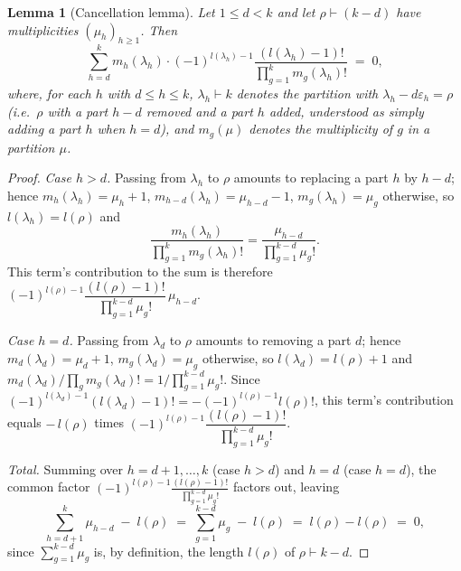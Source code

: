 \documentclass[11pt]{article}
\newtheorem{lemma}[theorem]{Lemma}
\theoremstyle{remark}
\begin{document}
\begin{lemma}[Cancellation lemma]\label{lem:cancel}
Let $1\le d<k$ and let $\rho\vdash(k-d)$ have multiplicities $(\mu_h)_{h\ge1}$. Then
\[
\sum_{h=d}^{k} m_h(\lambda_h)\cdot(-1)^{l(\lambda_h)-1}\frac{(l(\lambda_h)-1)!}{\prod_{g=1}^k m_g(\lambda_h)!} \;=\; 0,
\]
where, for each $h$ with $d\le h\le k$, $\lambda_h\vdash k$ denotes the partition with $\lambda_h-d\varepsilon_h=\rho$ (i.e.\ $\rho$ with a part $h-d$ removed and a part $h$ added, understood as simply adding a part $h$ when $h=d$), and $m_g(\mu)$ denotes the multiplicity of $g$ in a partition $\mu$.
\end{lemma}

\begin{proof}
\emph{Case $h>d$.} Passing from $\lambda_h$ to $\rho$ amounts to replacing a part $h$ by $h-d$; hence $m_h(\lambda_h)=\mu_h+1$, $m_{h-d}(\lambda_h)=\mu_{h-d}-1$, $m_g(\lambda_h)=\mu_g$ otherwise, so $l(\lambda_h)=l(\rho)$ and
\[
\frac{m_h(\lambda_h)}{\prod_{g=1}^k m_g(\lambda_h)!} = \frac{\mu_{h-d}}{\prod_{g=1}^{k-d}\mu_g!}.
\]
This term's contribution to the sum is therefore $(-1)^{l(\rho)-1}\dfrac{(l(\rho)-1)!}{\prod_{g=1}^{k-d}\mu_g!}\,\mu_{h-d}$.

\emph{Case $h=d$.} Passing from $\lambda_d$ to $\rho$ amounts to removing a part $d$; hence $m_d(\lambda_d)=\mu_d+1$, $m_g(\lambda_d)=\mu_g$ otherwise, so $l(\lambda_d)=l(\rho)+1$ and $m_d(\lambda_d)/\prod_g m_g(\lambda_d)! = 1/\prod_{g=1}^{k-d}\mu_g!$. Since $(-1)^{l(\lambda_d)-1}(l(\lambda_d)-1)! = -(-1)^{l(\rho)-1}l(\rho)!$, this term's contribution equals $-\,l(\rho)$ times $(-1)^{l(\rho)-1}\dfrac{(l(\rho)-1)!}{\prod_{g=1}^{k-d}\mu_g!}$.

\emph{Total.} Summing over $h=d+1,\dots,k$ (case $h>d$) and $h=d$ (case $h=d$), the common factor $(-1)^{l(\rho)-1}\frac{(l(\rho)-1)!}{\prod_{g=1}^{k-d}\mu_g!}$ factors out, leaving
\[
\sum_{h=d+1}^{k}\mu_{h-d} \;-\; l(\rho) \;=\; \sum_{g=1}^{k-d}\mu_g \;-\; l(\rho) \;=\; l(\rho) - l(\rho) \;=\; 0,
\]
since $\sum_{g=1}^{k-d}\mu_g$ is, by definition, the length $l(\rho)$ of $\rho\vdash k-d$.
\end{proof}
\end{document}
